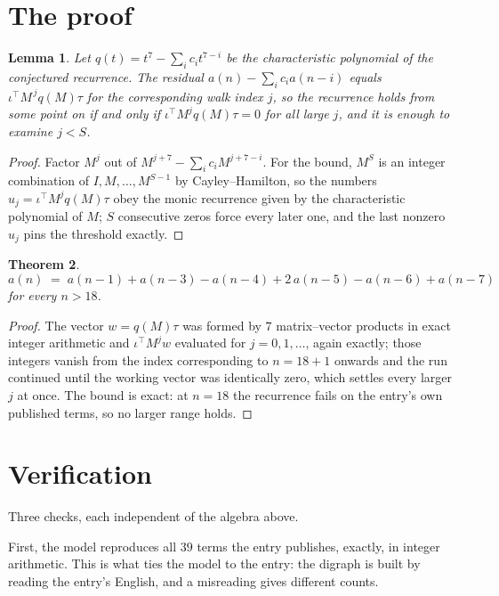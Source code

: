 \documentclass[11pt,a4paper]{article}
\theoremstyle{plain}
\newtheorem{theorem}{Theorem}
\newtheorem{lemma}[theorem]{Lemma}
\theoremstyle{definition}
\begin{document}
\section{The proof}

\begin{lemma}\label{lem:crit}
Let $q(t)=t^{7}-\sum_i c_it^{7-i}$ be the characteristic polynomial of the
conjectured recurrence. The residual $a(n)-\sum_ic_ia(n-i)$ equals
$\iota^{\!\top}M^{\,j}q(M)\tau$ for the corresponding walk index $j$, so the recurrence
holds from some point on if and only if $\iota^{\!\top}M^{j}q(M)\tau=0$ for all large $j$,
and it is enough to examine $j<S$.
\end{lemma}

\begin{proof}
Factor $M^{j}$ out of $M^{j+7}-\sum_ic_iM^{j+7-i}$. For the bound, $M^{S}$
is an integer combination of $I,M,\dots,M^{S-1}$ by Cayley--Hamilton, so the numbers
$u_j=\iota^{\!\top}M^{j}q(M)\tau$ obey the monic recurrence given by the characteristic
polynomial of $M$; $S$ consecutive zeros force every later one, and the last nonzero $u_j$
pins the threshold exactly.
\end{proof}

\begin{theorem}
\[
a(n)\;=\;a(n-1) + a(n-3) - a(n-4) + 2\,a(n-5) - a(n-6) + a(n-7)
\]
for every $n>18$.
\end{theorem}

\begin{proof}
The vector $w=q(M)\tau$ was formed by $7$ matrix--vector products in exact integer
arithmetic and $\iota^{\!\top}M^{j}w$ evaluated for $j=0,1,\dots$, again exactly; those
integers vanish from the index corresponding to $n=18+1$ onwards and the run continued
until the working vector was identically zero, which settles every larger $j$ at once. The bound is exact: at $n=18$ the recurrence fails on the entry's own published terms, so no larger range holds.
\end{proof}

\section{Verification}

Three checks, each independent of the algebra above.

First, the model reproduces all $39$ terms the entry publishes, exactly, in integer
arithmetic. This is what ties the model to the entry: the digraph is built by reading the
entry's English, and a misreading gives different counts.
\end{document}
